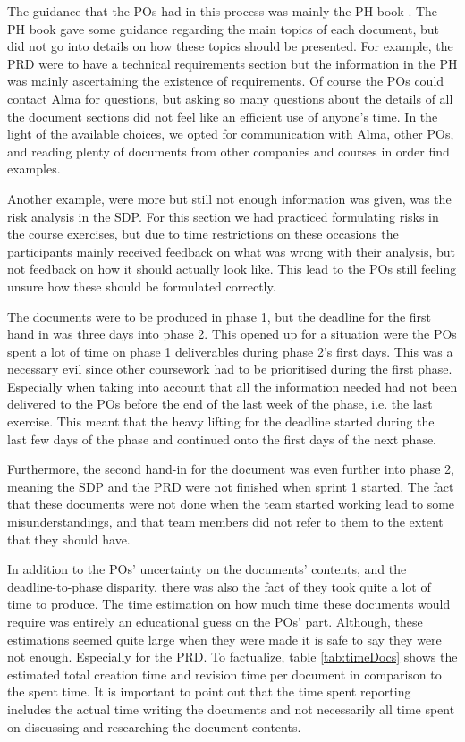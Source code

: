 \documentclass{article}
\begin{document}
The guidance that the POs had in this process was mainly the PH book \cite{PH}. The PH book gave some guidance regarding the main topics of each document, but did not go into details on how these topics should be presented. For example, the PRD were to have a technical requirements section but the information in the PH was mainly ascertaining the existence of requirements. Of course the POs could contact Alma for questions, but asking so many questions about the details of all the document sections did not feel like an efficient use of anyone's time. In the light of the available choices, we opted for communication with Alma, other POs, and reading plenty of documents from other companies and courses in order find examples.

Another example, were more but still not enough information was given, was the risk analysis in the SDP. For this section we had practiced formulating risks in the course exercises, but due to time restrictions on these occasions the participants mainly received feedback on what was wrong with their analysis, but not feedback on how it should actually look like. This lead to the POs still feeling unsure how these should be formulated correctly.

The documents were to be produced in phase 1, but the deadline for the first hand in was three days into phase 2. This opened up for a situation were the POs spent a lot of time on phase 1 deliverables during phase 2's first days. This was a necessary evil since other coursework had to be prioritised during the first phase. Especially when taking into account that all the information needed had not been delivered to the POs before the end of the last week of the phase, i.e. the last exercise. This meant that the heavy lifting for the deadline started during the last few days of the phase and continued onto the first days of the next phase. 

Furthermore, the second hand-in for the document was even further into phase 2, meaning the SDP and the PRD were not finished when sprint 1 started. The fact that these documents were not done when the team started working lead to some misunderstandings, and that team members did not refer to them to the extent that they should have. 

In addition to the POs' uncertainty on the documents' contents, and the deadline-to-phase disparity, there was also the fact of they took quite a lot of time to produce. The time estimation on how much time these documents would require was entirely an educational guess on the POs' part. Although, these estimations seemed quite large when they were made it is safe to say they were not enough. Especially for the PRD. To factualize, table \ref{tab:timeDocs} shows the estimated total creation time and revision time per document in comparison to the spent time. It is important to point out that the time spent reporting includes the actual time writing the documents and not necessarily all time spent on discussing and researching the document contents.
\end{document}
